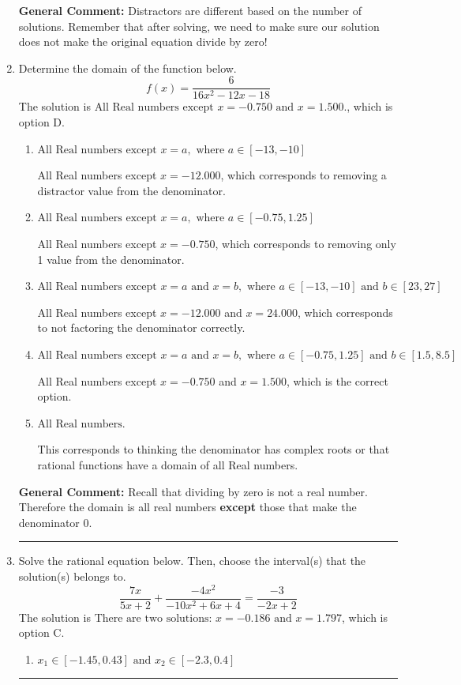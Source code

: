 \documentclass{extbook}[14pt]
\newcommand{\litem}[1]{\item #1

\rule{\textwidth}{0.4pt}}
\begin{document}
\begin{enumerate}
{\textbf{General Comment:} Distractors are different based on the number of solutions. Remember that after solving, we need to make sure our solution does not make the original equation divide by zero!
}
\litem{
Determine the domain of the function below.
\[ f(x) = \frac{6}{16x^{2} -12 x -18} \]
The solution is \( \text{All Real numbers except } x = -0.750 \text{ and } x = 1.500. \), which is option D.\begin{enumerate}[label=\Alph*.]
\item \( \text{All Real numbers except } x = a, \text{ where } a \in [-13, -10] \)

All Real numbers except $x = -12.000$, which corresponds to removing a distractor value from the denominator.
\item \( \text{All Real numbers except } x = a, \text{ where } a \in [-0.75, 1.25] \)

All Real numbers except $x = -0.750$, which corresponds to removing only 1 value from the denominator.
\item \( \text{All Real numbers except } x = a \text{ and } x = b, \text{ where } a \in [-13, -10] \text{ and } b \in [23, 27] \)

All Real numbers except $x = -12.000$ and $x = 24.000$, which corresponds to not factoring the denominator correctly.
\item \( \text{All Real numbers except } x = a \text{ and } x = b, \text{ where } a \in [-0.75, 1.25] \text{ and } b \in [1.5, 8.5] \)

All Real numbers except $x = -0.750$ and $x = 1.500$, which is the correct option.
\item \( \text{All Real numbers.} \)

This corresponds to thinking the denominator has complex roots or that rational functions have a domain of all Real numbers.
\end{enumerate}

\textbf{General Comment:} Recall that dividing by zero is not a real number. Therefore the domain is all real numbers \textbf{except} those that make the denominator 0.
}
\litem{
Solve the rational equation below. Then, choose the interval(s) that the solution(s) belongs to.
\[ \frac{7x}{5x + 2} + \frac{-4x^{2}}{-10x^{2} +6 x + 4} = \frac{-3}{-2x + 2} \]
The solution is \( \text{There are two solutions: } x = -0.186 \text{ and } x = 1.797 \), which is option C.\begin{enumerate}[label=\Alph*.]
\item \( x_1 \in [-1.45, 0.43] \text{ and } x_2 \in [-2.3,0.4] \)



\end{enumerate}}
\end{enumerate}
\end{document}
